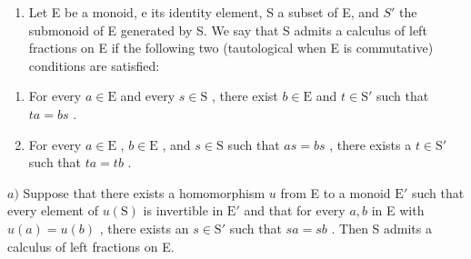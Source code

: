 \begin{enumerate}
\def\labelenumi{\arabic{enumi})}
\setcounter{enumi}{16}
\tightlist
\item
  Let E be a monoid, e its identity element, S a subset of E, and \(S'\) the submonoid of E generated by S. We say that S admits a calculus of left fractions on E if the following two (tautological when E is commutative) conditions are satisfied:
\end{enumerate}

\begin{enumerate}
\def\labelenumi{(\roman{enumi})}
\item
  For every \(a \in \mathrm{E}\) and every \(s \in \mathrm{S}\) , there exist \(b \in \mathrm{E}\) and \(t \in \mathrm{S}'\) such that \(ta = bs\) .
\item
  For every \(a \in \mathrm{E}\) , \(b \in \mathrm{E}\) , and \(s \in \mathrm{S}\) such that \(as = bs\) , there exists a \(t \in \mathrm{S}'\) such that \(ta = tb\) .
\end{enumerate}

\(a)\) Suppose that there exists a homomorphism \(u\) from E to a monoid \(\mathrm{E}'\) such that every element of \(u(\mathrm{S})\) is invertible in \(\mathrm{E}'\) and that for every \(a, b\) in E with \(u(a) = u(b)\) , there exists an \(s \in \mathrm{S}'\) such that \(sa = sb\) . Then S admits a calculus of left fractions on E.

